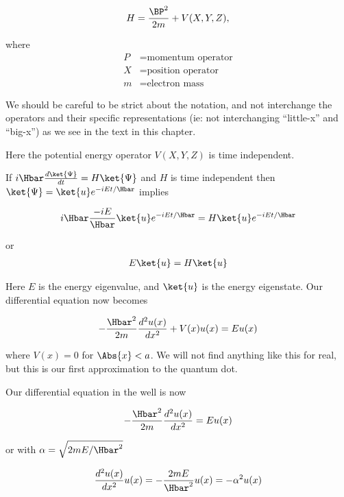 \begin{align}\label{eqn:PHY356Lecture9:3}
H = \frac{\BP^2}{2m} + V(X,Y,Z),
\end{align}

where
\begin{align*}
P &= \text{momentum operator} \\
X &= \text{position operator} \\
m &= \text{electron mass}
\end{align*}

We should be careful to be strict about the notation, and not interchange the operators and their specific representations (ie: not interchanging ``little-x'' and ``big-x'') as we see in the text in this chapter.

Here the potential energy operator $V(X,Y,Z)$ is time independent.

If $i \Hbar \frac{d\ket{\Psi}}{dt} = H \ket{\Psi}$ and $H$ is time independent then $\ket{\Psi} = \ket{u} e^{-i E t/\Hbar}$ implies

\begin{align*}
i \Hbar \frac{ -i E }{\Hbar} \ket{u} e^{-i E t/\Hbar} = H \ket{u} e^{-i E t/\Hbar}
\end{align*}

or
\begin{align}\label{eqn:PHY356Lecture9:4}
E \ket{u} = H \ket{u}
\end{align}

Here $E$ is the energy eigenvalue, and $\ket{u}$ is the energy eigenstate.  Our differential equation now becomes

\begin{align}\label{eqn:PHY356Lecture9:5}
-\frac{\Hbar^2 }{2m} \frac{d^2 u(x)}{dx^2} + V(x) u(x) = E u(x)
\end{align}

where $V(x) = 0$ for $\Abs{x} < a$.  We will not find anything like this for real, but this is our first approximation to the quantum dot.

Our differential equation in the well is now

\begin{align}\label{eqn:PHY356Lecture9:6}
-\frac{\Hbar^2 }{2m} \frac{d^2 u(x)}{dx^2} = E u(x)
\end{align}

or with $\alpha = \sqrt{2m E/\Hbar^2}$

\begin{align}\label{eqn:PHY356Lecture9:7}
\frac{d^2 u(x)}{dx^2} u(x) = -\frac{2 m E}{\Hbar^2} u(x) = - \alpha^2 u(x)
\end{align}

